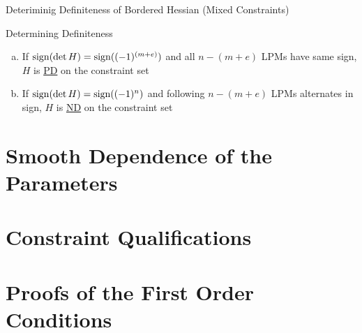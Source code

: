 \documentclass[final]{beamer}
\begin{document}
\begin{frame}[t]{Deteriminig Definiteness of Bordered Hessian (Mixed Constraints)}
	\begin{block}{Determining Definiteness}
		\begin{enumerate}[(a)]
			\item If ${\rm sign}(\det H)={\rm sign}((-1)^{(m+e)})$ and all $n-(m+e)$ LPMs have same sign, $H$ is \uline{PD} on the constraint set
			\item If ${\rm sign}(\det H)={\rm sign}((-1)^n)$ and following $n-(m+e)$ LPMs alternates in sign, $H$ is \uline{ND} on the constraint set
		\end{enumerate}
	\end{block}
\end{frame}

\section{Smooth Dependence of the Parameters} %
\label{sec:smooth_dependence_of_the_parameters}


\section{Constraint Qualifications} %
\label{sec:constraint_qualifications}


\section{Proofs of the First Order Conditions} %
\label{sec:proofs_of_the_first_order_conditions}

\end{document}
